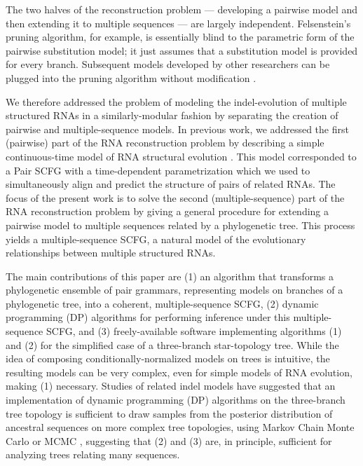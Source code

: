\documentclass[10pt]{article}
\begin{document}
The two halves of the reconstruction problem --- developing a pairwise model and then extending it to multiple sequences --- are largely independent.
Felsenstein's pruning algorithm, for example, is essentially blind to the parametric form of the pairwise substitution model;
it just assumes that a substitution model is provided for every branch.
Subsequent models developed by other researchers can be plugged into the pruning algorithm without modification \cite{Yang94b,WhelanGoldman2001}.

We therefore addressed the problem of modeling the indel-evolution of
multiple structured RNAs in a similarly-modular fashion by separating
the creation of pairwise and multiple-sequence models.  In previous
work, we addressed the first (pairwise) part of the RNA reconstruction
problem by describing a simple continuous-time model of RNA structural
evolution \cite{Holmes2004}.  This model corresponded to a Pair SCFG
with a time-dependent parametrization which we used to
simultaneously align and predict the structure of
pairs of related RNAs.  The focus of the present work is to solve the second
(multiple-sequence) part of the RNA reconstruction problem by giving a
general procedure for extending a pairwise model to multiple
sequences related by a phylogenetic tree.  This process
yields a multiple-sequence SCFG, a natural model of the evolutionary
relationships between multiple structured RNAs.

The main contributions of this paper are
(1) an algorithm that transforms a phylogenetic ensemble of pair
grammars, representing models on branches of a phylogenetic tree,
into a coherent, multiple-sequence SCFG,
(2) dynamic programming (DP) algorithms for performing inference under
this multiple-sequence SCFG, and
(3) freely-available software implementing algorithms (1) and (2) for
the simplified case of a three-branch star-topology tree.
While the idea of composing conditionally-normalized models on trees
is intuitive, the resulting models can be very complex, even for
simple models of RNA evolution, making (1) necessary.
Studies of related indel models have suggested that an implementation
of dynamic programming (DP) algorithms on the three-branch tree topology is sufficient to
draw samples from the posterior distribution of ancestral sequences on
more complex tree topologies, using Markov Chain Monte Carlo or MCMC
\cite{HolmesBruno2001,JensenHein2002,RedelingsSuchard2005},
suggesting that (2) and (3) are, in principle, sufficient for analyzing trees
relating many sequences.
\end{document}
